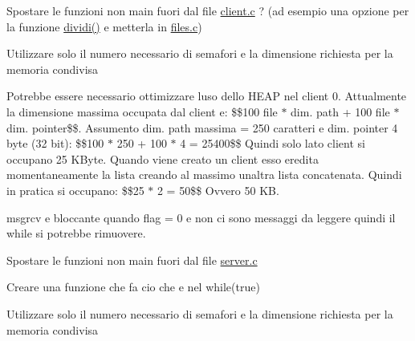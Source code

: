 
\begin{DoxyRefList}
\item[\label{todo__todo000001}%
\Hypertarget{todo__todo000001}%
File \hyperlink{client_8c}{client.c} ]Spostare le funzioni non main fuori dal file \hyperlink{client_8c}{client.\+c} ? (ad esempio una opzione per la funzione \hyperlink{client_8c_a55586f2b7e9b3620294cf78cda8abdad}{dividi()} e\textquotesingle{} metterla in \hyperlink{files_8c}{files.\+c})

Utilizzare solo il numero necessario di semafori e la dimensione richiesta per la memoria condivisa  
\item[\label{todo__todo000003}%
\Hypertarget{todo__todo000003}%
Globale \hyperlink{client_8h_a8c7084a254c7cd640d66e647795ff8f6}{operazioni\+\_\+client0} ()]Potrebbe essere necessario ottimizzare l\textquotesingle{}uso dello H\+E\+AP nel client 0. Attualmente la dimensione massima occupata dal client e\textquotesingle{}\+: \$\$100 file $\ast$ dim. path + 100 file $\ast$ dim. pointer\$\$. Assumento dim. path massima = 250 caratteri e dim. pointer 4 byte (32 bit)\+: \$\$100 $\ast$ 250 + 100 $\ast$ 4 = 25400\$\$ Quindi solo lato client si occupano 25 K\+Byte. Quando viene creato un client esso eredita momentaneamente la lista creando al massimo un\textquotesingle{}altra lista concatenata. Quindi in pratica si occupano\+: \$\$25 $\ast$ 2 = 50\$\$ Ovvero 50 KB.

msgrcv e\textquotesingle{} bloccante quando flag = 0 e non ci sono messaggi da leggere quindi il while si potrebbe rimuovere. 
\item[\label{todo__todo000005}%
\Hypertarget{todo__todo000005}%
File \hyperlink{server_8c}{server.c} ]Spostare le funzioni non main fuori dal file \hyperlink{server_8c}{server.\+c} 

Creare una funzione che fa cio\textquotesingle{} che e\textquotesingle{} nel while(true) 

Utilizzare solo il numero necessario di semafori e la dimensione richiesta per la memoria condivisa
\end{DoxyRefList}